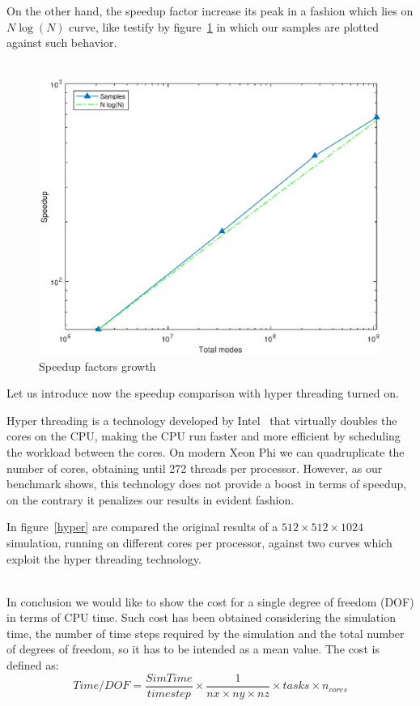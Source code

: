 On the other hand, the speedup factor increase its peak in a fashion which lies on $N\log(N)$ curve, like testify by figure~\ref{speedup:trend} in which our samples are plotted against such behavior. \\~\par
\begin{figure}
\begin{center}
\includegraphics[scale=0.55]{grafici/speedup_trend}
\caption{Speedup factors growth}
\label{speedup:trend}
\end{center}
\end{figure}
\par

Let us introduce now the speedup comparison with hyper threading turned on. \par
Hyper threading is a technology developed by Intel~\cite{hyper:paper}  that virtually doubles the cores on the CPU, making the CPU run faster and more efficient by scheduling the workload between the cores. On modern Xeon Phi we can quadruplicate the number of cores, obtaining until 272 threads per processor. However, as our benchmark shows, this technology does not provide a boost in terms of speedup, on the contrary it penalizes our results in evident fashion.\par
In figure~\ref{hyper} are compared the original results of a $512\times 512\times 1024$ simulation, running on different cores per processor, against two curves which exploit the hyper threading technology.\\~\par
In conclusion we would like to show the cost for a single degree of freedom (DOF) in terms of CPU time.
Such cost has been obtained considering the simulation time, the number of time steps required by the simulation and the total number of degrees of freedom, so it has to be intended as a mean value.
The cost is defined as:
\begin{equation}
Time/DOF = \frac{Sim Time}{timestep}\times \frac{1}{nx\times ny\times nz} \times {tasks}\times{n_{cores}}
\end{equation}

